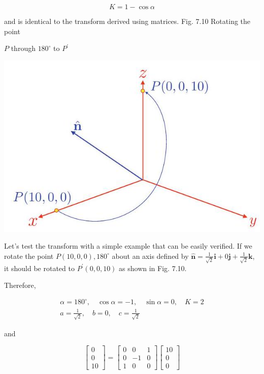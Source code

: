 \documentclass[10pt]{article}
\begin{document}
$$
K=1-\cos \alpha
$$

and is identical to the transform derived using matrices. Fig. 7.10 Rotating the point

$P$ through $180^{\circ}$ to $P^{\prime}$

\begin{center}
\includegraphics[max width=\textwidth]{2023_04_20_41f1ceac5a31dc7d1b59g-126}
\end{center}

Let's test the transform with a simple example that can be easily verified. If we rotate the point $P(10,0,0), 180^{\circ}$ about an axis defined by $\hat{\mathbf{n}}=\frac{1}{\sqrt{2}} \mathbf{i}+0 \mathbf{j}+\frac{1}{\sqrt{2}} \mathbf{k}$, it should be rotated to $P^{\prime}(0,0,10)$ as shown in Fig. 7.10.

Therefore,

$$
\begin{gathered}
\alpha=180^{\circ}, \quad \cos \alpha=-1, \quad \sin \alpha=0, \quad K=2 \\
a=\frac{1}{\sqrt{2}}, \quad b=0, \quad c=\frac{1}{\sqrt{2}}
\end{gathered}
$$

and

$$
\left[\begin{array}{c}
0 \\
0 \\
10
\end{array}\right]=\left[\begin{array}{ccc}
0 & 0 & 1 \\
0 & -1 & 0 \\
1 & 0 & 0
\end{array}\right]\left[\begin{array}{c}
10 \\
0 \\
0
\end{array}\right]
$$
\end{document}

